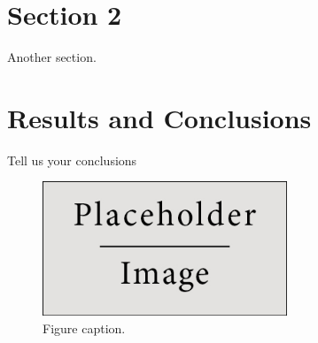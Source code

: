 \documentclass{article}
\begin{document}
\section{Section 2}

 Another section.


\section{Results and Conclusions}

Tell us your conclusions

\begin{figure}[h]
\begin{center}
\includegraphics[width=0.65\textwidth]{placeholder} %
\caption{Figure caption.}
\end{center}
\end{figure}






\end{document}
